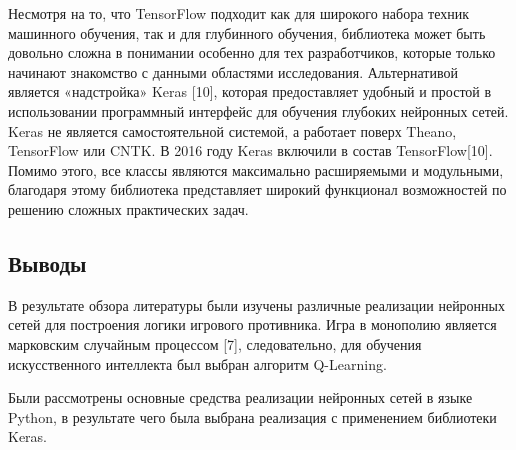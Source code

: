 \begin{Large}
Несмотря на то, что TensorFlow подходит как для широкого набора техник машинного обучения, так и для глубинного обучения, библиотека может быть довольно сложна в понимании особенно для тех разработчиков, которые только начинают знакомство с данными областями исследования. Альтернативой является «надстройка» Keras [10], которая предоставляет удобный и простой в использовании программный интерфейс для обучения глубоких нейронных сетей. Keras не является самостоятельной системой, а работает поверх Theano, TensorFlow или CNTK. В 2016 году Keras включили в состав TensorFlow[10]. Помимо этого, все классы являются максимально расширяемыми и модульными, благодаря этому библиотека представляет широкий функционал возможностей по решению сложных практических задач.
\subsection*{Выводы}
В результате обзора литературы были изучены различные реализации нейронных сетей для построения логики игрового противника. Игра в монополию является марковским случайным процессом [7], следовательно, для обучения искусственного интеллекта был выбран алгоритм Q-Learning.

Были рассмотрены основные средства реализации нейронных сетей в языке Python, в результате чего была выбрана реализация с применением библиотеки Keras.
\end{Large}
